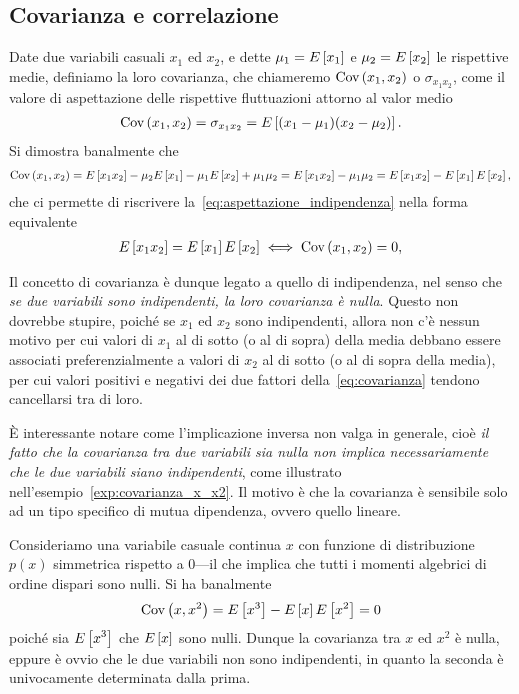 \subsection{Covarianza e correlazione}

Date due variabili casuali $x_1$ ed $x_2$, e dette $\mu_1 = \displaystyle E\left[x_1\right]$ e
$\mu_2 = \displaystyle E\left[x_2\right]$ le rispettive medie, definiamo la loro covarianza, che
chiameremo $\text{Cov}\left(x_1, x_2\right)$ o $\sigma_{x_1x_2}$, come
il valore di aspettazione delle rispettive fluttuazioni attorno al valor medio
\begin{align}\label{eq:covarianza}
  \text{Cov}\left(x_1, x_2\right) = \sigma_{x_1x_2} = \displaystyle E\left[(x_1 - \mu_1)(x_2 - \mu_2)\right].
\end{align}
Si dimostra banalmente che
\begin{align*}
  \text{Cov}\left(x_1, x_2\right) =
  \displaystyle E\left[x_1x_2\right] - \mu_2\displaystyle E\left[x_1\right] - \mu_1\displaystyle E\left[x_2\right] + \mu_1\mu_2 =
  \displaystyle E\left[x_1x_2\right] - \mu_1\mu_2 = \displaystyle E\left[x_1x_2\right] - \displaystyle E\left[x_1\right]\displaystyle E\left[x_2\right],
\end{align*}
che ci permette di riscrivere la~\eqref{eq:aspettazione_indipendenza} nella
forma equivalente
\begin{align*}
  \displaystyle E\left[x_1x_2\right] = \displaystyle E\left[x_1\right]\displaystyle E\left[x_2\right] \iff \text{Cov}\left(x_1, x_2\right) = 0,
\end{align*}

Il concetto di covarianza è dunque legato a quello di indipendenza, nel senso
che \emph{se due variabili sono indipendenti, la loro covarianza è nulla}.
Questo non dovrebbe stupire, poiché se $x_1$ ed $x_2$ sono indipendenti,
allora non c'è nessun motivo per cui valori di $x_1$ al di sotto (o al di
sopra) della media debbano essere associati preferenzialmente a valori di $x_2$
al di sotto (o al di sopra della media), per cui valori positivi e negativi dei
due fattori della~\eqref{eq:covarianza} tendono cancellarsi tra di loro.

\`E interessante notare come l'implicazione inversa non valga in generale,
cioè \emph{il fatto che la covarianza tra due variabili sia nulla non
  implica necessariamente che le due variabili siano indipendenti}, come
illustrato nell'esempio~\ref{exp:covarianza_x_x2}. Il motivo è che la
covarianza è sensibile solo ad un tipo specifico di mutua dipendenza, ovvero
quello lineare.

\begin{examplebox}
  \begin{example}\label{exp:covarianza_x_x2}
    Consideriamo una variabile casuale continua $x$ con funzione di
    distribuzione $p(x)$ simmetrica rispetto a $0$---il che implica che tutti
    i momenti algebrici di ordine dispari sono nulli. Si ha banalmente
    \begin{align*}
      \text{Cov}\left(x, x^2\right) = \displaystyle E\left[x^3\right] - \displaystyle E\left[x\right]\displaystyle E\left[x^2\right] = 0
    \end{align*}
    poiché sia $\displaystyle E\left[x^3\right]$ che $\displaystyle E\left[x\right]$ sono nulli. Dunque la
    covarianza tra $x$ ed $x^2$ è nulla, eppure è ovvio che le due
    variabili non sono indipendenti, in quanto la seconda è univocamente
    determinata dalla prima.
  \end{example}
\end{examplebox}

